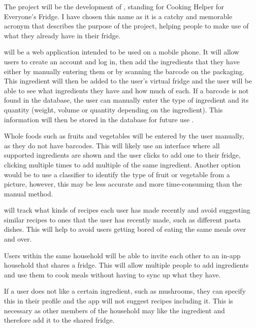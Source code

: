 \documentclass[../CHEFCookingHelperForEveryonesFridge.tex]{subfiles}
\begin{document}
The project will be the development of \chef{}, standing for Cooking Helper for Everyone's Fridge. I have chosen this name
as it is a catchy and memorable acronym that describes the purpose of the project, helping people to make use of
what they already have in their fridge.

\chef{} will be a web application intended to be used on a mobile phone. It will allow users to create an account and log in,
then add the ingredients that they have either by manually entering them or by scanning the barcode on the packaging.
This ingredient will then be added to the user's virtual fridge and the user will be able to see what ingredients they have and how much of each.
If a barcode is not found in the database, the user can manually enter the type of ingredient and its quantity (weight, volume or quantity depending on the ingredient).
This information will then be stored in the database for future use .

Whole foods such as fruits and vegetables will be entered by the user manually, as they do not have barcodes. This will likely use an interface where
all supported ingredients are shown and the user clicks to add one to their fridge, clicking multiple times to add multiple of the same ingredient.
Another option would be to use a classifier to identify the type of fruit or vegetable from a picture, however, this may be less accurate and more
time-consuming than the manual method.

\chef{} will track what kinds of recipes each user has made recently and avoid suggesting similar recipes
to ones that the user has recently made, such as different pasta dishes. This will help to avoid users
getting bored of eating the same meals over and over.

Users within the same household will be able to invite each other to an in-app household that shares a fridge.
This will allow multiple people to add ingredients and use them to cook meals without having to sync up
what they have.

If a user does not like a certain ingredient, such as mushrooms, they can specify this in their profile and
the \chef{} app will not suggest recipes including it. This is necessary as other members of the household
may like the ingredient and therefore add it to the shared fridge.
\end{document}
